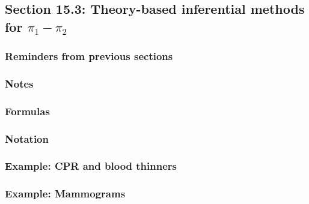 \documentclass[
]{report}
\begin{document}
\hypertarget{section-15.3-theory-based-inferential-methods-for-pi_1---pi_2}{%
\subsection*{\texorpdfstring{Section 15.3: Theory-based inferential methods for \(\pi_1 - \pi_2\)}{Section 15.3: Theory-based inferential methods for \textbackslash pi\_1 - \textbackslash pi\_2}}\label{section-15.3-theory-based-inferential-methods-for-pi_1---pi_2}}

\hypertarget{reminders-from-previous-sections-8}{%
\subsubsection*{Reminders from previous sections}\label{reminders-from-previous-sections-8}}

\hypertarget{notes-21}{%
\subsubsection*{Notes}\label{notes-21}}

\hypertarget{formulas-2}{%
\subsubsection*{Formulas}\label{formulas-2}}

\hypertarget{notation-1}{%
\subsubsection*{Notation}\label{notation-1}}

\hypertarget{example-cpr-and-blood-thinners-1}{%
\subsubsection*{Example: CPR and blood thinners}\label{example-cpr-and-blood-thinners-1}}

\hypertarget{example-mammograms}{%
\subsubsection*{Example: Mammograms}\label{example-mammograms}}
\end{document}
